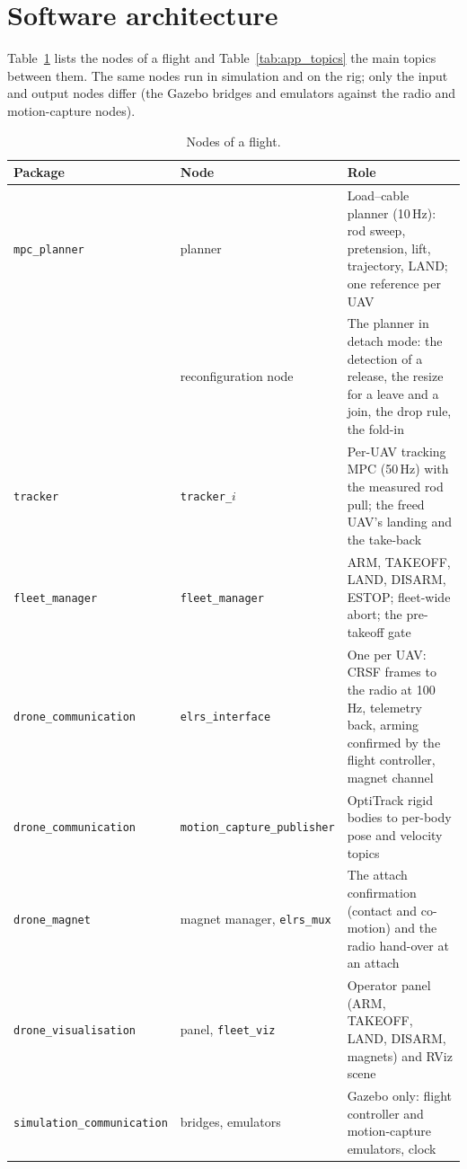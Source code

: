 \appendix

\section{Software architecture}
\label{sec:app_software}

Table~\ref{tab:app_nodes} lists the nodes of a flight and Table~\ref{tab:app_topics} the main
topics between them. The same nodes run in simulation and on the rig; only the input and output
nodes differ (the Gazebo bridges and emulators against the radio and motion-capture nodes).

\begin{table}[H]
\centering
\small
\caption{Nodes of a flight.}
\label{tab:app_nodes}
\begin{tabularx}{\textwidth}{llX}
\toprule
Package & Node & Role \\
\midrule
\texttt{mpc\_planner} & planner & Load--cable planner (10\,Hz): rod sweep, pretension, lift, trajectory, LAND; one reference per UAV \\
 & reconfiguration node & The planner in detach mode: the detection of a release, the resize for a leave and a join, the drop rule, the fold-in \\
\texttt{tracker} & \texttt{tracker\_}$i$ & Per-UAV tracking MPC (50\,Hz) with the measured rod pull; the freed UAV's landing and the take-back \\
\texttt{fleet\_manager} & \texttt{fleet\_manager} & ARM, TAKEOFF, LAND, DISARM, ESTOP; fleet-wide abort; the pre-takeoff gate \\
\texttt{drone\_communication} & \texttt{elrs\_interface} & One per UAV: CRSF frames to the radio at 100\,Hz, telemetry back, arming confirmed by the flight controller, magnet channel \\
\texttt{drone\_communication} & \texttt{motion\_capture\_publisher} & OptiTrack rigid bodies to per-body pose and velocity topics \\
\texttt{drone\_magnet} & magnet manager, \texttt{elrs\_mux} & The attach confirmation (contact and co-motion) and the radio hand-over at an attach \\
\texttt{drone\_visualisation} & panel, \texttt{fleet\_viz} & Operator panel (ARM, TAKEOFF, LAND, DISARM, magnets) and RViz scene \\
\texttt{simulation\_communication} & bridges, emulators & Gazebo only: flight controller and motion-capture emulators, clock \\
\bottomrule
\end{tabularx}
\end{table}

